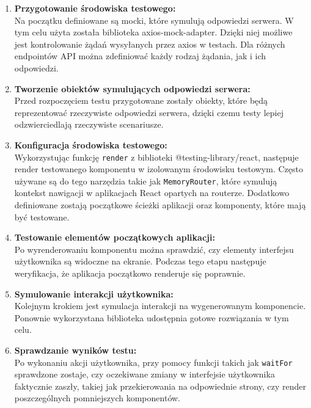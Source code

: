 \documentclass[twoside]{projektInzynierskiMS1}
\begin{document}
\begin{enumerate}
    \item \textbf{Przygotowanie środowiska testowego:}\\
    Na początku definiowane są mocki, które symulują odpowiedzi serwera. W tym celu użyta została biblioteka axios-mock-adapter. Dzięki niej możliwe jest kontrolowanie żądań wysyłanych przez axios w testach. Dla różnych endpointów API można zdefiniować każdy rodzaj żądania, jak i ich odpowiedzi.

    \item \textbf{Tworzenie obiektów symulujących odpowiedzi serwera:}\\
    Przed rozpoczęciem testu przygotowane zostały obiekty, które będą reprezentować rzeczywiste odpowiedzi serwera, dzięki czemu testy lepiej odzwierciedlają rzeczywiste scenariusze.

    \item \textbf{Konfiguracja środowiska testowego:}\\
    Wykorzystując funkcję \texttt{render} z biblioteki @testing-library/react, następuje render testowanego komponentu w izolowanym środowisku testowym. Często używane są do tego narzędzia takie jak \texttt{MemoryRouter}, które symulują kontekst nawigacji w aplikacjach React opartych na routerze. Dodatkowo definiowane zostają początkowe ścieżki aplikacji oraz komponenty, które mają być testowane.

    \item \textbf{Testowanie elementów początkowych aplikacji:}\\
    Po wyrenderowaniu komponentu można sprawdzić, czy elementy interfejsu użytkownika są widoczne na ekranie. Podczas tego etapu następuje weryfikacja, że aplikacja początkowo renderuje się poprawnie.

    \item \textbf{Symulowanie interakcji użytkownika:}\\
    Kolejnym krokiem jest symulacja interakcji na wygenerowanym komponencie. Ponownie wykorzystana biblioteka udostępnia gotowe rozwiązania w tym celu.

    \item \textbf{Sprawdzanie wyników testu:}\\
    Po wykonaniu akcji użytkownika, przy pomocy funkcji takich jak \texttt{waitFor} sprawdzone zostaje, czy oczekiwane zmiany w interfejsie użytkownika faktycznie zaszły, takiej jak przekierowania na odpowiednie strony, czy render poszczególnych pomniejszych komponentów.

\end{enumerate}
\end{document}

